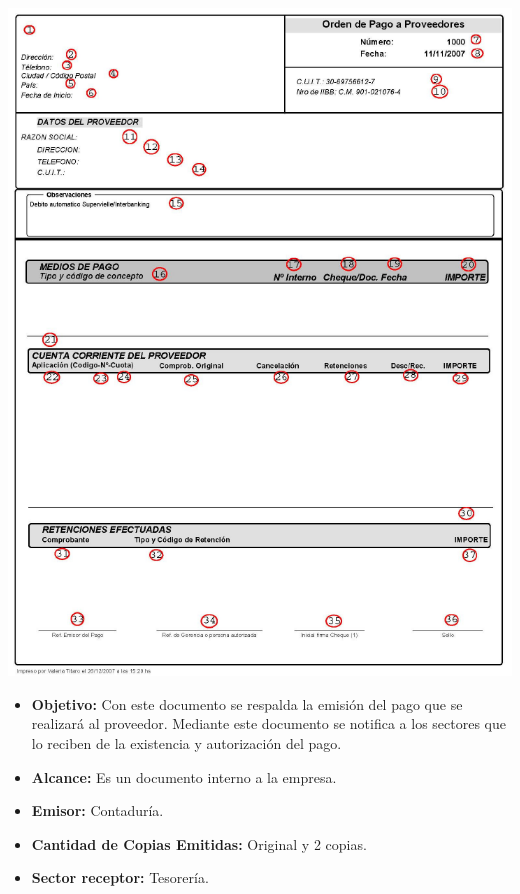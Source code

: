 \begin{center}
 \includegraphics[scale=0.8,keepaspectratio=true]{./Circuitos-Teoricos/Pago-a-Proveedores/Images/orden-de-pago.png}
\end{center}

\pagebreak
\begin{itemize}
  \item \textbf{Objetivo:} Con este documento se respalda la emisión del pago que se realizará al proveedor.
Mediante este documento se notifica a los sectores que lo reciben de la existencia y autorización
del pago.
  \item \textbf{Alcance:} Es un documento interno a la empresa.
  \item \textbf{Emisor:} Contaduría.
  \item \textbf{Cantidad de Copias Emitidas:} Original y 2 copias.
  \item \textbf{Sector receptor:} Tesorería.
\end{itemize}

